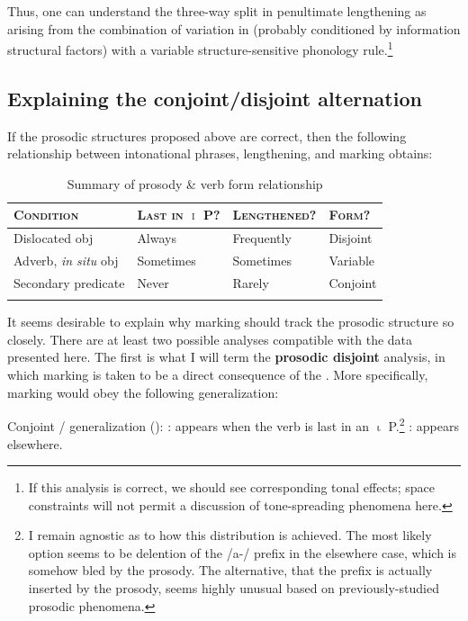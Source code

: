 \documentclass[output=paper 
,modfonts
,nonflat]{langsci/langscibook}
\begin{document}
Thus, one can understand the three-way split in penultimate lengthening as
arising from the combination of variation in  (probably
conditioned by information structural factors) with a variable
structure-sensitive phonology rule.\footnote{If this analysis is correct, we
should see corresponding tonal effects; space constraints will not permit a
discussion of  tone-spreading phenomena here.}

\subsection{Explaining the conjoint\slash disjoint alternation}

If the prosodic structures proposed above are correct, then the following
relationship between intonational phrases, lengthening, and  marking
obtains:

\begin{table}
	\caption{Summary of prosody \& verb form relationship}
	\label{tab:kusmer:summary_ip_disj}
\begin{tabular}{llll}
\lsptoprule
\textsc{Condition} & \textsc{Last in $\upiota$ P?} & \textsc{Lengthened?} &
	\textsc{Form?}\\
	\midrule
{Dislocated obj}       & Always    & Frequently & Disjoint\\
{Adverb, \textit{in situ} obj} & Sometimes & Sometimes  & Variable\\
{Secondary predicate}     & Never     & Rarely     & Conjoint\\
\lspbottomrule
\end{tabular}
\end{table}

It seems desirable to explain why  marking should track the prosodic
structure so closely. There are at least two possible analyses compatible with
the data presented here. The first is what I will term the \textbf{prosodic
disjoint} analysis, in which  marking is taken to be a direct
consequence of the . More specifically,  
marking would obey the following generalization:


\ea \label{ex:kusmer:venda_gen_fin} {Conjoint /  generalization ():}
	: appears when the verb is last in an $\upiota$
	P.\footnote{I remain agnostic as to how this distribution is achieved. The
	most likely option seems to be delention of the /a-/ prefix in the
	elsewhere case, which is somehow bled by the prosody. The alternative, that
	the prefix is actually inserted by the prosody, seems highly unusual based
	on previously-studied prosodic phenomena.}
	: appears elsewhere.
	\z
\z
\end{document}
